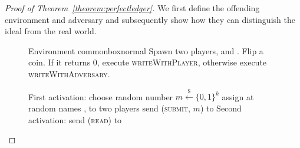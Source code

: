   \begin{proof}[Proof of Theorem~\ref{theorem:perfectledger}]
    We first define the offending environment and adversary and subsequently
    show how they can distinguish the ideal from the real world. \\

    \begin{figure}
      \begin{titlebox}{Environment \normalfont \perfectenv}{commonbox}{normal}
        Spawn two players, \alice{} and \bob. Flip a coin. If it returns 0,
        execute \textsc{writeWithPlayer}, otherwise execute
        \textsc{writeWithAdversary}.
        \begin{algorithmic}[1]
            \State First activation:
            \Indent
              \State choose random number $m \overset{\$}{\gets} \{0, 1\}^k$
              \State assign at random names \alice, \bob{} to two players
              \State send (\textsc{submit}, $m$) to \alice
            \EndIndent
            \State Second activation:
            \Indent
              \State send (\textsc{read}) to \bob
                \State {} 
                \label{fig:perfectledger:env:coin0:real}
                \State {} 
                \label{fig:perfectledger:env:coin0:comm}
                \State {} 
                \label{fig:perfectledger:env:coin0:nocomm}
              \EndIf
            \EndIndent
          \EndProcedure
          \Statex


\end{algorithmic}
\end{titlebox}
\end{figure}
\end{proof}
